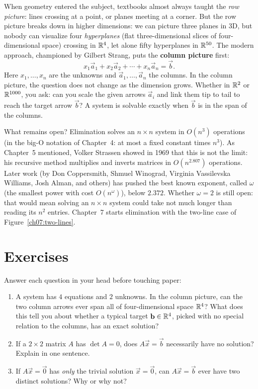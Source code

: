 \begin{historybox}
When geometry entered the subject, textbooks almost always taught the
\emph{row picture}: lines crossing at a point, or planes meeting at a corner.
But the row picture breaks down in higher dimensions: we can picture
three planes in 3D, but nobody can visualize four \emph{hyperplanes} (flat
three-dimensional slices of four-dimensional space) crossing in $\mathbb{R}^4$, let
alone fifty hyperplanes in $\mathbb{R}^{50}$. The modern approach, championed by
Gilbert Strang, puts the \textbf{column picture} first:
\[
  x_1\vec{a}_1 + x_2\vec{a}_2 + \cdots + x_n\vec{a}_n = \vec{b}.
\]
Here $x_1,\dots,x_n$ are the unknowns and $\vec a_1,\dots,\vec a_n$ the
columns. In the column picture, the question does not change as the
dimension grows. Whether in $\mathbb{R}^2$ or $\mathbb{R}^{1000}$, you ask: can you scale
the given arrows $\vec{a}_i$ and link them tip to tail to reach the target
arrow $\vec{b}$? A system is solvable exactly when $\vec b$ is in the span
of the columns.

What remains open? Elimination solves an $n\times n$ system in $O(n^3)$
operations (in the big-O notation of Chapter~4: at most a fixed constant times $n^3$).
As Chapter~5 mentioned, Volker Strassen showed in 1969 that this is not the
limit: his recursive method multiplies and inverts matrices in
$O(n^{2.807})$ operations. Later work (by Don Coppersmith, Shmuel Winograd,
Virginia Vassilevska Williams, Josh Alman, and others) has pushed the best
known exponent, called $\omega$ (the smallest power with cost
$O(n^{\omega})$), below $2.372$. Whether $\omega = 2$ is still open: that
would mean solving an $n\times n$ system could take not much longer than
reading its $n^2$ entries. Chapter~7 starts elimination with the two-line
case of Figure~\ref{ch07:two-lines}.
\end{historybox}

\section{Exercises}

\begin{exercise}
\label{ch06:ex-warmup}
Answer each question in your head before touching paper:
\begin{enumerate}[label=(\alph*)]
  \item A system has $4$ equations and $2$ unknowns. In the column picture, can the two column arrows ever span all of four-dimensional space $\mathbb{R}^4$? What does this tell you about whether a typical target $\mathbf{b}\in\mathbb{R}^4$, picked with no special relation to the columns, has an exact solution?
  \item If a $2\times 2$ matrix $A$ has $\det A = 0$, does $A\vec x = \vec b$ necessarily have no solution? Explain in one sentence.
  \item If $A\vec x = \vec 0$ has \emph{only} the trivial solution $\vec x = \vec 0$, can $A\vec x = \vec b$ ever have two distinct solutions? Why or why not?
\end{enumerate}
\end{exercise}

